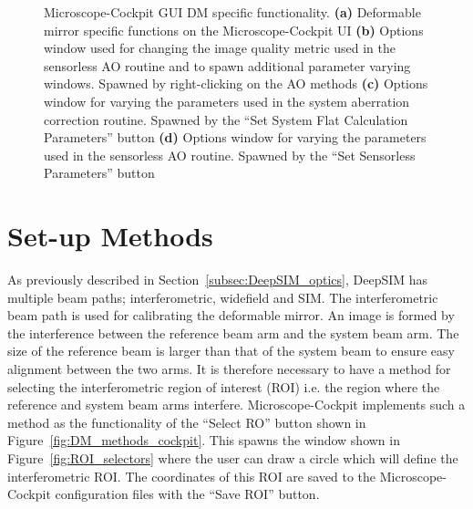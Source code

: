 \begin{figure}
\begin{subfigure}{0.35\textwidth}
	\end{subfigure}
	\caption[Microscope-Cockpit GUI DM specific functionality]{Microscope-Cockpit GUI DM specific functionality. \textbf{(a)} Deformable mirror specific functions on the Microscope-Cockpit UI \textbf{(b)} Options window used for changing the image quality metric used in the sensorless AO routine and to spawn additional parameter varying windows. Spawned by right-clicking on the AO methods \textbf{(c)} Options window for varying the parameters used in the system aberration correction routine. Spawned by the ``Set System Flat Calculation Parameters'' button \textbf{(d)} Options window for varying the parameters used in the sensorless AO routine. Spawned by the ``Set Sensorless Parameters'' button}
	\label{fig:DeepSIM_control_software}
\end{figure}

\section{Set-up Methods}
\label{sec:set_up_methods}

As previously described in Section~\ref{subsec:DeepSIM_optics}, DeepSIM has multiple beam paths; interferometric, widefield and SIM. The interferometric beam path is used for calibrating the deformable mirror. An image is formed by the interference between the reference beam arm and the system beam arm. The size of the reference beam is larger than that of the system beam to ensure easy alignment between the two arms. It is therefore necessary to have a method for selecting the interferometric region of interest (ROI) i.e. the region where the reference and system beam arms interfere. Microscope-Cockpit implements such a method as the functionality of the ``Select RO'' button shown in Figure~\ref{fig:DM_methods_cockpit}. This spawns the window shown in Figure~\ref{fig:ROI_selectors} where the user can draw a circle which will define the interferometric ROI. The coordinates of this ROI are saved to the Microscope-Cockpit configuration files with the ``Save ROI'' button.

